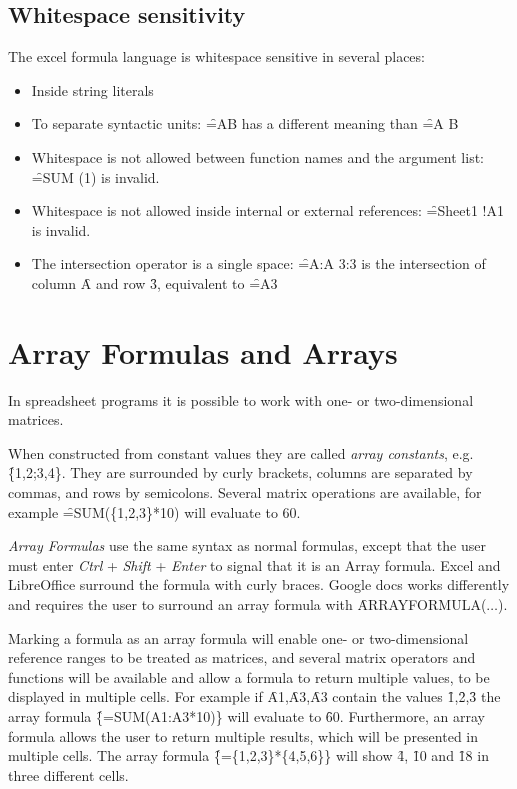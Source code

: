 \subsection{Whitespace sensitivity}

The excel formula language is whitespace sensitive in several places:
\begin{itemize}
\item Inside string literals
\item To separate syntactic units: \f{=AB} has a different meaning than \f{=A B}
\item Whitespace is not allowed between function names and the argument list: \f{=SUM  (1)} is invalid.
\item Whitespace is not allowed inside internal or external references: \f{=Sheet1 !A1} is invalid.
\item The intersection operator is a single space: \f{=A:A 3:3} is the intersection of column \f{A} and row \f{3}, equivalent to \f{=A3}
\end{itemize}

\section{Array Formulas and Arrays}
\label{sec:arrayformulas}
In spreadsheet programs it is possible to work with one- or two-dimensional matrices.

When constructed from constant values they are called \emph{array constants}, e.g. \f{\{1,2;3,4\}}.
They are surrounded by curly brackets, columns are separated by commas, and rows by semicolons.
Several matrix operations are available, for example \f{=SUM(\{1,2,3\}*10)} will evaluate to 60.

\emph{Array Formulas} use the same syntax as normal formulas, except that the user must enter \emph{Ctrl} + \emph{Shift} + \emph{Enter} to signal that it is an Array formula.
Excel and LibreOffice surround the formula with curly braces.
Google docs works differently and requires the user to surround an array formula with \f{ARRAYFORMULA($\ldots$)}.

Marking a formula as an array formula will enable one- or two-dimensional reference ranges to be treated as matrices, and several matrix operators and functions will be available and allow a formula to return multiple values, to be displayed in multiple cells.
For example if \f{A1},\f{A3},\f{A3} contain the values \f{1},\f{2},\f{3} the array formula \f{\{=SUM(A1:A3*10)\}} will evaluate to \f{60}.
Furthermore, an array formula allows the user to return multiple results, which will be presented in multiple cells.
The array formula \f{\{=\{1,2,3\}*\{4,5,6\}\}} will show \f{4}, \f{10} and \f{18} in three different cells.

